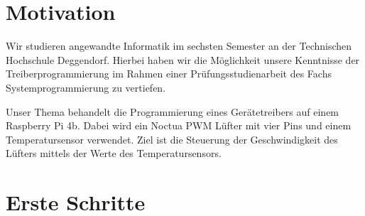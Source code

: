 \section{Motivation}
Wir studieren angewandte Informatik im sechsten Semester an der Technischen Hochschule Deggendorf. Hierbei haben wir die Möglichkeit unsere Kenntnisse der Treiberprogrammierung im Rahmen einer Prüfungsstudienarbeit des Fachs Systemprogrammierung zu vertiefen.

Unser Thema behandelt die Programmierung eines Gerätetreibers auf einem Raspberry Pi 4b.
Dabei wird ein Noctua PWM Lüfter mit vier Pins und einem Temperatursensor verwendet.
Ziel ist die Steuerung der Geschwindigkeit des Lüfters mittels der Werte des Temperatursensors.

\section{Erste Schritte}
